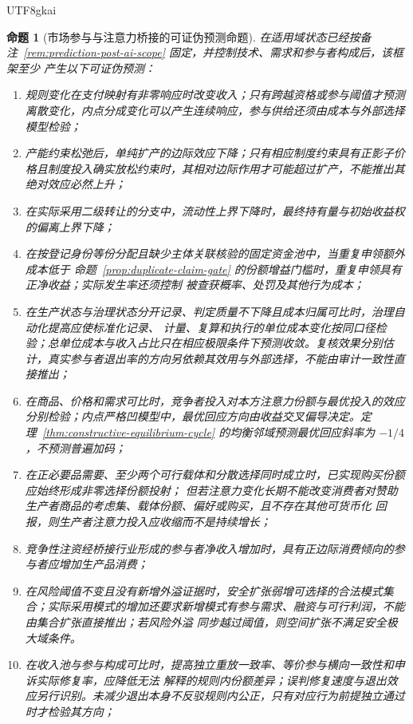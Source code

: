 \documentclass[12pt,a4paper,openany]{report}
\newtheorem{proposition}{命题}[chapter]
\begin{document}
\begin{CJK*}{UTF8}{gkai}
\begin{proposition}[市场参与与注意力桥接的可证伪预测命题]
\label{prop:falsifiable-predictions}
在适用域状态已经按备注~\ref{rem:prediction-post-ai-scope} 固定，并控制技术、需求和参与者构成后，该框架至少
产生以下可证伪预测：
\begin{enumerate}[label=\textnormal{P\arabic*:},leftmargin=3.5em]
  \item 规则变化在支付映射有非零响应时改变收入；只有跨越资格或参与阈值才预测离散变化，内点分成变化可以产生连续响应，参与供给还须由成本与外部选择模型检验；
  \item 产能约束松弛后，单纯扩产的边际效应下降；只有相应制度约束具有正影子价格且制度投入确实放松约束时，其相对边际作用才可能超过扩产，不能推出其绝对效应必然上升；
  \item 在实际采用二级转让的分支中，流动性上界下降时，最终持有量与初始收益权的偏离上界下降；
  \item 在按登记身份等份分配且缺少主体关联核验的固定资金池中，当重复申领额外成本低于
  命题~\ref{prop:duplicate-claim-gate} 的份额增益门槛时，重复申领具有正净收益；实际发生率还须控制
  被查获概率、处罚及其他行为成本；
  \item 在生产状态与治理状态分开记录、判定质量不下降且成本归属可比时，治理自动化提高应使标准化记录、
  计量、复算和执行的单位成本变化按同口径检验；总单位成本与收入占比只在相应极限条件下预测收敛。复核效果分别估计，真实参与者退出率的方向另依赖其效用与外部选择，不能由审计一致性直接推出；
  \item 在商品、价格和需求可比时，竞争者投入对本方注意力份额与最优投入的效应分别检验；内点严格凹模型中，最优回应方向由收益交叉偏导决定。定理~\ref{thm:constructive-equilibrium-cycle} 的均衡邻域预测最优回应斜率为 $-1/4$，不预测普遍加码；
  \item 在正必要品需要、至少两个可行载体和分散选择同时成立时，已实现购买份额应始终形成非零选择份额投射；
  但若注意力变化长期不能改变消费者对赞助生产者商品的考虑集、载体份额、偏好或购买，且不存在其他可货币化
  回报，则生产者注意力投入应收缩而不是持续增长；
  \item 竞争性注资经桥接行业形成的参与者净收入增加时，具有正边际消费倾向的参与者应增加生产品消费；
  \item 在风险阈值不变且没有新增外溢证据时，安全扩张弱增可选择的合法模式集合；实际采用模式的增加还要求新增模式有参与需求、融资与可行利润，不能由集合扩张直接推出；若风险外溢
  同步越过阈值，则空间扩张不满足安全极大域条件。
  \item 在收入池与参与构成可比时，提高独立重放一致率、等价参与横向一致性和申诉实际修复率，应降低无法
  解释的规则内份额差异；误判修复速度与退出效应另行识别。未减少退出本身不反驳规则内公正，只有对应行为前提独立通过时才检验其方向；

\end{enumerate}
\end{proposition}
\end{CJK*}
\end{document}
